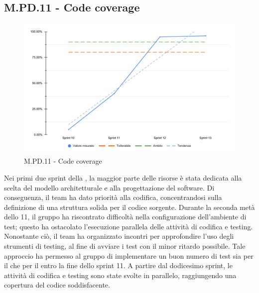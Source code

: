 \subsection{M.PD.11 - Code coverage}

\begin{figure}[H]
  \centering
  \includegraphics[width=\textwidth]{assets/code_coverage.pdf}
  \caption{M.PD.11 - Code coverage}
\end{figure}

\par Nei primi due sprint della , la maggior parte delle risorse è stata dedicata alla scelta del modello architetturale e alla progettazione del software. Di conseguenza, il team ha dato priorità alla codifica, concentrandosi sulla definizione di una struttura solida per il codice sorgente. Durante la seconda metà dello  11, il gruppo ha riscontrato difficoltà nella configurazione dell'ambiente di test; questo ha ostacolato l'esecuzione parallela delle attività di codifica e testing. Nonostante ciò, il team ha organizzato incontri per approfondire l'uso degli strumenti di testing, al fine di avviare i test con il minor ritardo possibile. Tale approccio ha permesso al gruppo di implementare un buon numero di test sia per il  che per il  entro la fine dello sprint 11. A partire dal dodicesimo sprint, le attività di codifica e testing sono state svolte in parallelo, raggiungendo una copertura del codice soddisfacente.